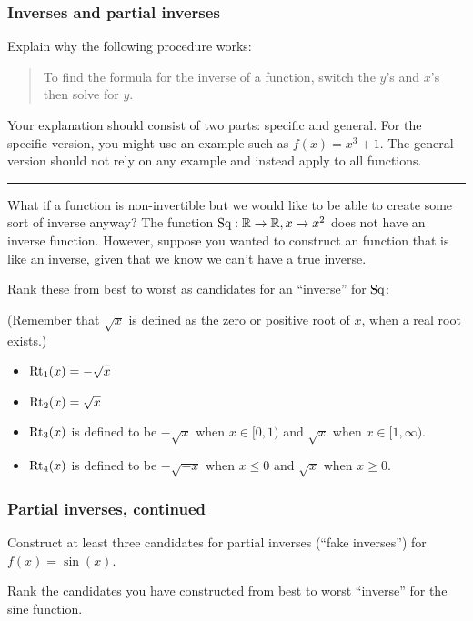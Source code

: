 \documentclass[11pt]{article}
\newcommand{\handout}{\subsubsection}
\newcommand\tn{\textnormal}
\newcommand{\R}{\mathbb{R}}
\theoremstyle{definition}
\begin{document}
\newpage
\handout{Inverses and partial inverses}

Explain why the following procedure works:

\begin{quote}
To find the formula for the inverse of a function, switch the $y$'s and $x$'s then solve for $y$.
\end{quote}

Your explanation should consist of two parts: specific and general. For the specific version, you might use an example such as $f(x)=x^3+1$. The general version should not rely on any example and instead apply to all functions.

\vfill 

\vspace*{2pt}\hrule\vspace*{2pt}
What if a function is non-invertible but we would like to be able to create some sort of inverse anyway? 
The function $\tn{Sq}:\R\to\R, x\mapsto x^2$ does not have an inverse function. However, suppose you wanted to construct an function that is like an inverse, given that we know we can't have a true inverse.

Rank these from best to worst as candidates for an ``inverse'' for $\tn{Sq}$:

(Remember that $\sqrt{x}$ is defined as the zero or positive root of $x$, when a real root exists.)

\begin{itemize}[label=$\circ$]
\item $\tn{Rt}_1(x)=-\sqrt{x}$ 
\item $\tn{Rt}_2(x)=\sqrt{x}$
\item $\tn{Rt}_3(x)$ is defined to be $-\sqrt{x}$ when $x\in[0,1)$ and $\sqrt{x}$ when $x\in [1,\infty)$.
\item $\tn{Rt}_4(x)$ is defined to be $-\sqrt{-x}$ when $x\leq 0$ and $\sqrt{x}$ when $x\geq 0$.
\end{itemize}

\vfill
\newpage
\subsubsection*{Partial inverses, continued}

Construct at least three candidates for partial inverses (``fake inverses'') for $f(x)=\sin(x)$. 

Rank the candidates you have constructed from best to worst ``inverse'' for the sine function.
\end{document}

